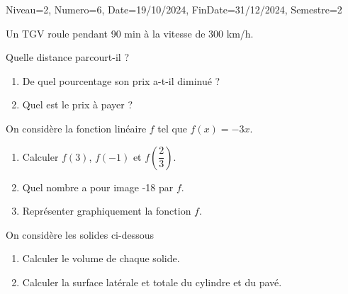 \documentclass[a4paper,12pt]{article}
\begin{document}
\begin{Maquette}[DM]{Niveau=2, Numero=6, Date=19/10/2024, FinDate=31/12/2024, Semestre=2}
\begin{exercice}
Un TGV roule pendant 90 min  à la vitesse de 300 km/h.

Quelle distance parcourt-il ?
\end{exercice}

\begin{exercice}
\begin{enumerate}
\item  De quel pourcentage son prix a-t-il diminué ?
\item Quel est le prix à payer ?
\end{enumerate}
\end{exercice}

\begin{exercice}
On considère la fonction linéaire $f$ tel que $f(x)=-3x$.
\begin{enumerate}
\item Calculer $f(3)$, $f(-1)$ et $f(\dfrac{2}{3})$.
\item Quel nombre a pour image -18 par $f$.
\item Représenter graphiquement la fonction $f$.
\end{enumerate}
\end{exercice}

\begin{exercice}
On considère les solides ci-dessous

\begin{enumerate}
\item Calculer le volume de chaque solide.
\item Calculer la surface latérale et totale du cylindre et du pavé.
\end{enumerate}
\end{exercice}

\end{Maquette}
\end{document}
